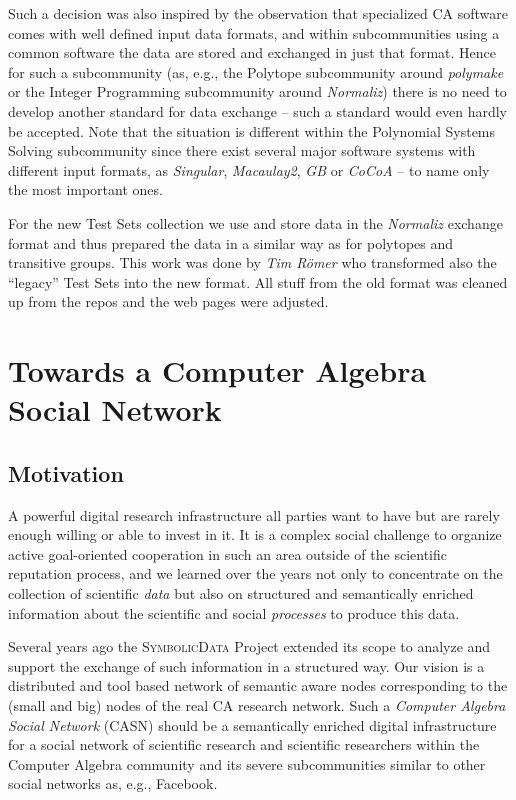 \documentclass[a4paper,11pt]{article}
\def\SD{\textsc{SymbolicData}}
\begin{document}
Such a decision was also inspired by the observation that specialized CA
software comes with well defined input data formats, and within subcommunities
using a common software the data are stored and exchanged in just that format.
Hence for such a subcommunity (as, e.g., the Polytope subcommunity around
\emph{polymake} or the Integer Programming subcommunity around \emph{Normaliz})
there is no need to develop another standard for data exchange -- such a
standard would even hardly be accepted.  Note that the situation is different
within the Polynomial Systems Solving subcommunity since there exist several
major software systems with different input formats, as \emph{Singular},
\emph{Macaulay2}, \emph{GB} or \emph{CoCoA} -- to name only the most important
ones.

For the new Test Sets collection we use and store data in the \emph{Normaliz}
exchange format and thus prepared the data in a similar way as for polytopes
and transitive groups. This work was done by \emph{Tim R\"omer} who
transformed also the ``legacy'' Test Sets into the new format.  All stuff from
the old format was cleaned up from the repos and the web pages were adjusted.

\section{Towards a Computer Algebra Social Network}

\subsection{Motivation}

A powerful digital research infrastructure all parties want to have but are
rarely enough willing or able to invest in it.  It is a complex social
challenge to organize active goal-oriented cooperation in such an area outside
of the scientific reputation process, and we learned over the years not only to
concentrate on the collection of scientific \emph{data} but also on structured
and semantically enriched information about the scientific and social
\emph{processes} to produce this data.  

Several years ago the {\SD} Project extended its scope to analyze and support
the exchange of such information in a structured way.  Our vision is a
distributed and tool based network of semantic aware nodes corresponding to the
(small and big) nodes of the real CA research network.  Such a \emph{Computer
  Algebra Social Network} (CASN) should be a semantically enriched digital
infrastructure for a social network of scientific research and scientific
researchers within the Computer Algebra community and its severe subcommunities
similar to other social networks as, e.g., Facebook.  
\end{document}
